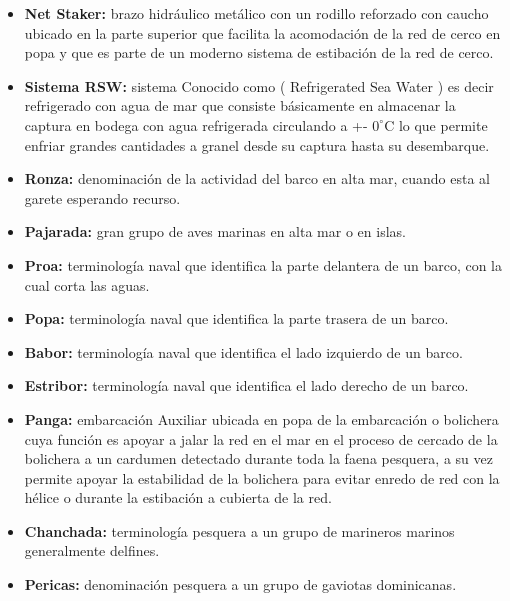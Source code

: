 \documentclass[a4paper,oneside,11pt]{book}
\begin{document}
\begin{itemize}
\item{\textbf{Net Staker:}} brazo hidráulico  metálico con un rodillo reforzado con caucho ubicado en la parte superior  que facilita la acomodación  de la red de cerco en popa y que es parte de un moderno sistema de estibación de la red de cerco.

\item{\textbf{Sistema RSW:}} sistema Conocido como ( Refrigerated Sea Water ) es decir refrigerado con agua de mar que consiste básicamente en almacenar la captura en bodega  con agua refrigerada circulando a +- $0^{\circ}$C lo que permite enfriar grandes cantidades a granel desde su captura hasta su desembarque. 

\item{\textbf{Ronza:}} denominación de la actividad del barco en alta mar, cuando esta al garete esperando recurso.

\item{\textbf{Pajarada:}} gran grupo de aves marinas en alta mar o en islas.
  
\item{\textbf{Proa:}} terminología naval que identifica la parte delantera de un barco, con la cual corta las aguas.

\item{\textbf{Popa:}} terminología naval que identifica la parte trasera  de un barco.
 
\item{\textbf{Babor:}} terminología naval que identifica el lado izquierdo de un barco.

\item{\textbf{Estribor:}} terminología naval que identifica el lado derecho de un barco.

\item{\textbf{Panga:}} embarcación Auxiliar ubicada en popa de la embarcación o bolichera cuya función es apoyar a jalar la red en el mar en  el proceso de cercado de la bolichera a un cardumen detectado durante toda la faena pesquera, a su vez permite apoyar  la estabilidad de la bolichera para evitar  enredo de red con la hélice o durante la estibación a cubierta de la red.

\item{\textbf{Chanchada:}} terminología pesquera  a un grupo de marineros marinos generalmente delfines.

\item{\textbf{Pericas:}} denominación pesquera a un grupo de gaviotas dominicanas.
 

\end{itemize}
\end{document}
